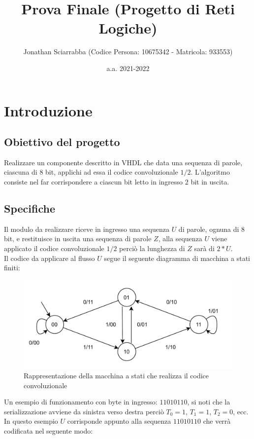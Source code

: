 \documentclass{article}
\title{Prova Finale (Progetto di Reti Logiche)}
\author{Jonathan Sciarrabba (Codice Persona: 10675342 - Matricola: 933553)}
\date{a.a. 2021-2022}
\begin{document}
\maketitle
\tableofcontents
\clearpage


\section{Introduzione}
\subsection{Obiettivo del progetto}
Realizzare un componente descritto in VHDL che data una sequenza di parole, ciascuna di 8 bit, applichi ad essa il codice convoluzionale $1/2$. L'algoritmo consiste nel far corrispondere a ciascun bit letto in ingresso 2 bit in uscita.

\subsection{Specifiche}
Il modulo da realizzare riceve in ingresso una sequenza $U$ di parole, ognuna di 8 bit, e restituisce in uscita una sequenza di parole $Z$, alla sequenza $U$ viene applicato il codice convoluzionale $1/2$ perciò la lunghezza di $Z$ sarà di $2*U$.\\Il codice da applicare al flusso $U$ segue il seguente diagramma di macchina a stati finiti:\\

\begin{figure}[h]
\includegraphics[scale=0.39]{fsm_conv.PNG}
\centering
\caption{Rappresentazione della macchina a stati che realizza il codice convoluzionale}
\centering
\end{figure}
Un esempio di funzionamento con byte in ingresso: $11010110$, si noti che la serializzazione avviene da sinistra verso destra perciò $T_0 = 1$, $T_1 = 1$, $T_2 = 0$, ecc.\\
In questo esempio $U$ corrisponde appunto alla sequenza $11010110$ che verrà codificata nel seguente modo:
\end{document}
